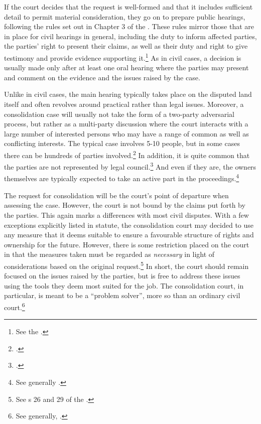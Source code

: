 If the court decides that the request is well-formed and that it includes sufficient detail to permit material consideration, they go on to prepare public hearings, following the rules set out in Chapter 3 of the \cite{lca79}. These rules mirror those that are in place for civil hearings in general, including the duty to inform affected parties, the parties' right to present their claims, as well as their duty and right to give testimony and provide evidence supporting it.\footnote{See the \cite[13|15|17 a|18]{lca79}.} As in civil cases, a decision is usually made only after at least one oral hearing where the parties may present and comment on the evidence and the issues raised by the case.

Unlike in civil cases, the main hearing typically takes place on the disputed land itself and often revolves around practical rather than legal issues. Moreover, a consolidation case will usually not take the form of a two-party adversarial process, but rather as a multi-party discussion where the court interacts with a large number of interested persons who may have a range of common as well as conflicting interests. The typical case involves 5-10 people, but in some cases there can be hundreds of parties involved.\footcite[39]{langbach09} In addition, it is quite common that the parties are not represented by legal council.\footcite[109-111]{rognes00} And even if they are, the owners themselves are typically expected to take an active part in the proceedings.\footnote{See generally \cite{rognes00}.}

The request for consolidation will be the court's point of departure when assessing the case. However, the court is not bound by the claims put forth by the parties. This again marks a differences with most civil disputes. With a few exceptions explicitly listed in statute, the consolidation court may decided to use any measure that it deems suitable to ensure a favourable structure of rights and ownership for the future. However, there is some restriction placed on the court in that the measures taken must be regarded as \emph{necessary} in light of considerations based on the original request.\footnote{See s 26 and 29 of the \cite{lca79}.} In short, the court should remain focused on the issues raised by the parties, but is free to address these issues using the tools they deem most suited for the job. The consolidation court, in particular, is meant to be a ``problem solver'', more so than an ordinary civil court.\footnote{See generally, \cite{rognes07}.}

